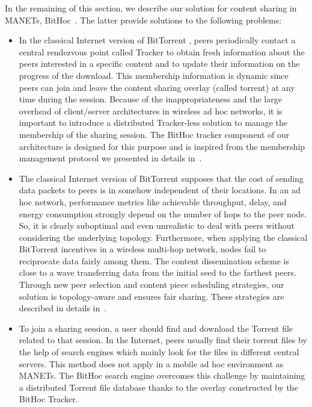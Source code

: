 In the remaining of this section, we describe our solution for content sharing in MANETs, BitHoc~\cite{BitHoc, BitHocWeb}. The latter provide solutions to the following problems:

\begin{itemize}
\item{In the classical Internet version of BitTorrent \cite{RefBT}, peers periodically contact a central rendezvous point called Tracker to obtain fresh information about the peers interested in a specific content and to update their information on the progress of the download. This membership information is dynamic since peers can join and leave the content sharing overlay (called torrent) at any time during the session. Because of the inappropriateness and the large overhead of client/server architectures in wireless ad hoc networks, it is important to introduce a distributed Tracker-less solution to manage the membership of the sharing session. The BitHoc tracker component of our architecture is designed for this purpose and is inspired from the membership management protocol we presented in details in~\cite{BitHoc}.}
\item{The classical Internet version of BitTorrent \cite{RefBT} supposes that the cost of sending data packets to peers is in somehow independent of their locations. In an ad hoc network, performance metrics like achievable throughput, delay, and energy consumption strongly depend on the number of hops to the peer node. So, it is clearly suboptimal and even unrealistic to deal with peers without considering the underlying topology. Furthermore, when applying the classical BitTorrent incentives in a wireless multi-hop network, nodes fail to reciprocate data fairly among them. The content dissemination scheme is close to a wave transferring data from the initial seed to the farthest peers. Through new peer selection and content piece scheduling strategies, our solution is topology-aware and ensures fair sharing. These strategies are described in details in~\cite{BitHoc}.}
\item{To join a sharing session, a user should find and download the Torrent file related to that session. In the Internet, peers usually find their torrent files by the help of search engines which mainly look for the files in different central servers. This method does not apply in a mobile ad hoc environment as MANETs. The BitHoc search engine overcomes this challenge by maintaining a distributed Torrent file database thanks to the overlay constructed by the BitHoc Tracker.}
\end{itemize}

